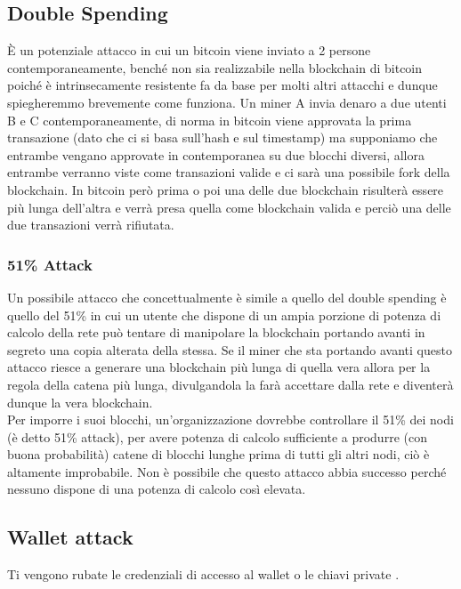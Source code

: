 \subsection{Double Spending}

È un potenziale attacco in cui un bitcoin viene inviato a 2 persone
contemporaneamente, benché non sia realizzabile nella blockchain di bitcoin
poiché è intrinsecamente resistente fa da base per molti altri attacchi e dunque
spiegheremmo brevemente come funziona. Un miner A invia denaro a due utenti B e
C contemporaneamente, di norma in bitcoin viene approvata la prima transazione
(dato che ci si basa sull'hash e sul timestamp) ma supponiamo che entrambe
vengano approvate in contemporanea su due blocchi diversi, allora entrambe
verranno viste come transazioni valide e ci sarà una possibile fork della
blockchain. In bitcoin però prima o poi una delle due blockchain
risulterà essere più lunga dell'altra e verrà presa quella come blockchain
valida e perciò una delle due transazioni verrà rifiutata.

\subsubsection{51\% Attack}

Un possibile attacco che concettualmente è simile a quello del double spending è
quello del 51\% in cui un utente che dispone di un ampia porzione di potenza di
calcolo della rete può tentare di manipolare la blockchain portando avanti in
segreto una copia alterata della stessa. Se il miner che sta portando avanti
questo attacco riesce a generare una blockchain più lunga di quella vera allora
per la regola della catena più lunga, divulgandola la farà accettare dalla rete
e diventerà dunque la vera blockchain.\\
Per imporre i suoi blocchi, un'organizzazione dovrebbe controllare il 51\% dei
nodi (è detto 51\% attack), per avere potenza di calcolo sufficiente a produrre
(con buona probabilità) catene di blocchi lunghe prima di tutti gli altri nodi,
ciò è altamente improbabile. Non è possibile che questo attacco abbia successo
perché nessuno dispone di una potenza di calcolo così elevata.

\subsection{Wallet attack}

Ti vengono rubate le credenziali di accesso al wallet o le chiavi private
.

